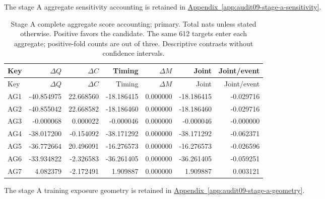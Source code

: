 \noindent The stage A aggregate sensitivity accounting is retained in \hyperref[app:audit09-stage-a-sensitivity]{Appendix~\ref{app:audit09-stage-a-sensitivity}}.

{\small
\setlength{\tabcolsep}{3pt}
\begin{longtable}{lrrrrrr}
\caption{Stage A complete aggregate score accounting; primary. Total nats unless stated otherwise. Positive favors the candidate. The same 612 targets enter each aggregate; positive-fold counts are out of three. Descriptive contrasts without confidence intervals.}\label{tab:AG-primary}\\
\toprule
Key & $\Delta Q$ & $\Delta C$ & Timing & $\Delta M$ & Joint & Joint/event\\\midrule
\endfirsthead
\toprule
Key & $\Delta Q$ & $\Delta C$ & Timing & $\Delta M$ & Joint & Joint/event\\\midrule
\endhead
AG1 & -40.854975 & 22.668560 & -18.186415 & 0.000000 & -18.186415 & -0.029716\\
AG2 & -40.855042 & 22.668582 & -18.186460 & 0.000000 & -18.186460 & -0.029716\\
AG3 & -0.000068 & 0.000022 & -0.000046 & 0.000000 & -0.000046 & -0.000000\\
AG4 & -38.017200 & -0.154092 & -38.171292 & 0.000000 & -38.171292 & -0.062371\\
AG5 & -36.772664 & 20.496091 & -16.276573 & 0.000000 & -16.276573 & -0.026596\\
AG6 & -33.934822 & -2.326583 & -36.261405 & 0.000000 & -36.261405 & -0.059251\\
AG7 & 4.082379 & -2.172491 & 1.909887 & 0.000000 & 1.909887 & 0.003121\\
\bottomrule
\end{longtable}
}

\noindent The stage A training exposure geometry is retained in \hyperref[app:audit09-stage-a-geometry]{Appendix~\ref{app:audit09-stage-a-geometry}}.

